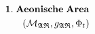 \documentclass[preview]{standalone}
\begin{document}
\begin{align*}
\special{dvisvgm:raw <g id='unique000'>}\mathbf{1.\;Aeonische\;Area}\\(\mathcal{M}_{\mathfrak{AR}}, g_{\mathfrak{AR}}, \Phi_t)\special{dvisvgm:raw </g>}
\end{align*}
\end{document}
